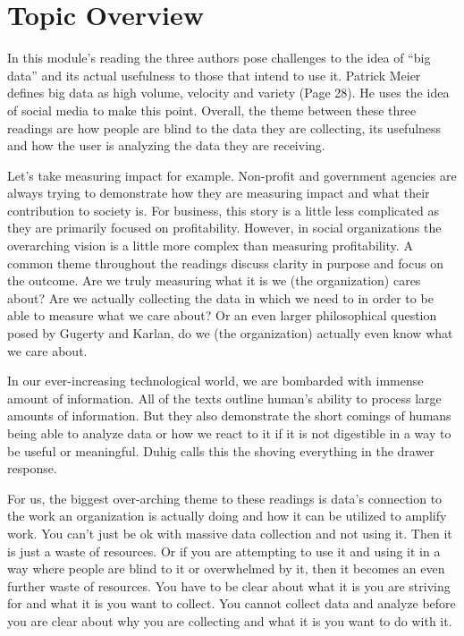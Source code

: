 \documentclass[]{book}
\begin{document}
\hypertarget{topic-overview-1}{%
\section{Topic Overview}\label{topic-overview-1}}

In this module's reading the three authors pose challenges to the idea of ``big data'' and its actual usefulness to those that intend to use it. Patrick Meier defines big data as high volume, velocity and variety (Page 28). He uses the idea of social media to make this point. Overall, the theme between these three readings are how people are blind to the data they are collecting, its usefulness and how the user is analyzing the data they are receiving.

Let's take measuring impact for example. Non-profit and government agencies are always trying to demonstrate how they are measuring impact and what their contribution to society is. For business, this story is a little less complicated as they are primarily focused on profitability. However, in social organizations the overarching vision is a little more complex than measuring profitability. A common theme throughout the readings discuss clarity in purpose and focus on the outcome. Are we truly measuring what it is we (the organization) cares about? Are we actually collecting the data in which we need to in order to be able to measure what we care about? Or an even larger philosophical question posed by Gugerty and Karlan, do we (the organization) actually even know what we care about.

In our ever-increasing technological world, we are bombarded with immense amount of information. All of the texts outline human's ability to process large amounts of information. But they also demonstrate the short comings of humans being able to analyze data or how we react to it if it is not digestible in a way to be useful or meaningful. Duhig calls this the shoving everything in the drawer response.

For us, the biggest over-arching theme to these readings is data's connection to the work an organization is actually doing and how it can be utilized to amplify work. You can't just be ok with massive data collection and not using it. Then it is just a waste of resources. Or if you are attempting to use it and using it in a way where people are blind to it or overwhelmed by it, then it becomes an even further waste of resources. You have to be clear about what it is you are striving for and what it is you want to collect. You cannot collect data and analyze before you are clear about why you are collecting and what it is you want to do with it.
\end{document}
